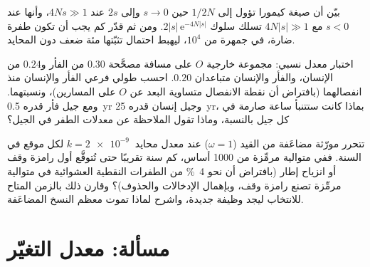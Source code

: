 \begin{exercise}[$\star\star\star$]\label{exo:b3:molecular-evolution:10}
بيّن أن صيغة كيمورا تؤول إلى $1/2N$ حين $s \to 0$ وإلى $2s$
عند $4Ns \gg 1$، وأنها عند $s < 0$ مع $4N|s| \gg 1$ تسلك سلوك
$2|s|\,\mathrm{e}^{-4N|s|}$. ومن ثم قدّر كم يجب أن تكون طفرة
ضارة، في جمهرة من $10^{4}$، ليهبط احتمال تثبّتها مئة ضعف دون
المحايد.
\end{exercise}

\begin{exercise}[$\star\star\star$]\label{exo:b3:molecular-evolution:11}
اختبار معدل نسبي: مجموعة خارجية $O$ على مسافة مصحَّحة $0.30$
من الفأر و$0.24$ من الإنسان، والفأر والإنسان متباعدان $0.20$. احسب طولي فرعي
الفأر والإنسان منذ انفصالهما (بافتراض أن نقطة الانفصال
متساوية البعد عن $O$ على المسارين)، ونسبتهما. ومع جيل فأر
قدره \qty{0.5}{yr} وجيل إنسان قدره \qty{25}{yr}، بماذا كانت
ستتنبأ ساعة صارمة في كل جيل بالنسبة، وماذا تقول الملاحظة عن
معدلات الطفر في الجيل؟
\end{exercise}

\begin{exercise}[$\star\star\star$]\label{exo:b3:molecular-evolution:12}
تتحرر مورّثة مضاعَفة من القيد ($\omega = 1$) عند معدل محايد
$k = \qty{2e-9}{}$ لكل موقع في السنة. ففي متوالية مرمِّزة من
1000 أساس، كم سنة تقريبًا حتى تُتوقَّع أول رامزة وقف أو
انزياح إطار (بافتراض أن نحو \qty{4}{\%} من الطفرات النقطية
العشوائية في متوالية مرمِّزة تصنع رامزة وقف، وبإهمال الإدخالات
والحذوف)؟ وقارن ذلك بالزمن المتاح للانتخاب ليجد وظيفة جديدة،
واشرح لماذا تموت معظم النسخ المضاعَفة.
\end{exercise}

\section{مسألة: معدل التغيّر}

